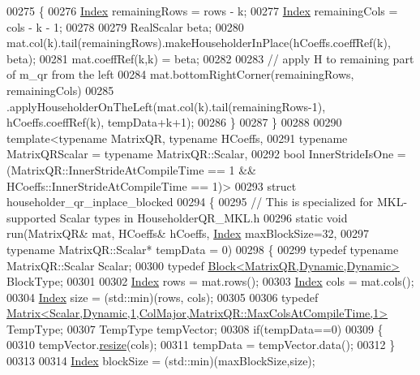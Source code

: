 \begin{DoxyCode}
00275   \{
00276     \hyperlink{namespace_eigen_a62e77e0933482dafde8fe197d9a2cfde}{Index} remainingRows = rows - k;
00277     \hyperlink{namespace_eigen_a62e77e0933482dafde8fe197d9a2cfde}{Index} remainingCols = cols - k - 1;
00278 
00279     RealScalar beta;
00280     mat.col(k).tail(remainingRows).makeHouseholderInPlace(hCoeffs.coeffRef(k), beta);
00281     mat.coeffRef(k,k) = beta;
00282 
00283     \textcolor{comment}{// apply H to remaining part of m\_qr from the left}
00284     mat.bottomRightCorner(remainingRows, remainingCols)
00285         .applyHouseholderOnTheLeft(mat.col(k).tail(remainingRows-1), hCoeffs.coeffRef(k), tempData+k+1);
00286   \}
00287 \}
00288 
00290 \textcolor{keyword}{template}<\textcolor{keyword}{typename} MatrixQR, \textcolor{keyword}{typename} HCoeffs,
00291   \textcolor{keyword}{typename} MatrixQRScalar = \textcolor{keyword}{typename} MatrixQR::Scalar,
00292   \textcolor{keywordtype}{bool} InnerStrideIsOne = (MatrixQR::InnerStrideAtCompileTime == 1 && HCoeffs::InnerStrideAtCompileTime == 
      1)>
00293 \textcolor{keyword}{struct} householder\_qr\_inplace\_blocked
00294 \{
00295   \textcolor{comment}{// This is specialized for MKL-supported Scalar types in HouseholderQR\_MKL.h}
00296   \textcolor{keyword}{static} \textcolor{keywordtype}{void} run(MatrixQR& mat, HCoeffs& hCoeffs, \hyperlink{namespace_eigen_a62e77e0933482dafde8fe197d9a2cfde}{Index} maxBlockSize=32,
00297       \textcolor{keyword}{typename} MatrixQR::Scalar* tempData = 0)
00298   \{
00299     \textcolor{keyword}{typedef} \textcolor{keyword}{typename} MatrixQR::Scalar Scalar;
00300     \textcolor{keyword}{typedef} \hyperlink{group___core___module_class_eigen_1_1_block}{Block<MatrixQR,Dynamic,Dynamic>} BlockType;
00301 
00302     \hyperlink{namespace_eigen_a62e77e0933482dafde8fe197d9a2cfde}{Index} rows = mat.rows();
00303     \hyperlink{namespace_eigen_a62e77e0933482dafde8fe197d9a2cfde}{Index} cols = mat.cols();
00304     \hyperlink{namespace_eigen_a62e77e0933482dafde8fe197d9a2cfde}{Index} size = (std::min)(rows, cols);
00305 
00306     \textcolor{keyword}{typedef} \hyperlink{group___core___module_class_eigen_1_1_matrix}{Matrix<Scalar,Dynamic,1,ColMajor,MatrixQR::MaxColsAtCompileTime,1>}
       TempType;
00307     TempType tempVector;
00308     \textcolor{keywordflow}{if}(tempData==0)
00309     \{
00310       tempVector.\hyperlink{class_eigen_1_1_plain_object_base_a99d9054ee2d5a40c6e00ded0265e9cea}{resize}(cols);
00311       tempData = tempVector.data();
00312     \}
00313 
00314     \hyperlink{namespace_eigen_a62e77e0933482dafde8fe197d9a2cfde}{Index} blockSize = (std::min)(maxBlockSize,size);

\end{DoxyCode}
